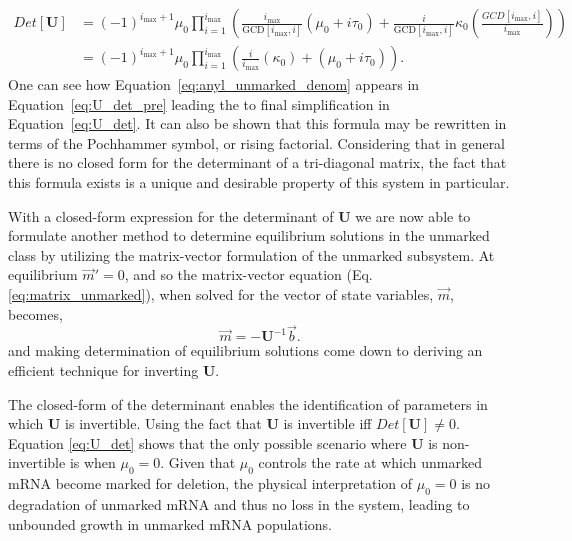\documentclass[review]{elsarticle}
\newcommand{\imax}{\ensuremath{i_{\max}}\xspace}
\newcommand{\GCD}{\ensuremath{\text{GCD}}\xspace}
\let\bs\boldsymbol
\begin{document}
\begin{align}
Det[\bs{U}] &= (-1)^{\imax+1}\mu_0\prod_{i=1}^{\imax}\left(\frac{\imax}{\GCD[\imax,i]}(\mu_0+i\tau_0)+\frac{i}{\GCD[\imax,i]}\kappa_0\left(\frac{GCD[\imax,i]}{\imax}\right)\right)\label{eq:U_det_pre}\\
& =(-1)^{\imax+1}\mu_0\prod_{i=1}^{\imax}{\left(\frac{i}{\imax}(\kappa_0)+(\mu_0+i\tau_0)\right)}.\label{eq:U_det}
\end{align}
One can see how Equation~\ref{eq:anyl_unmarked_denom} appears in Equation~\ref{eq:U_det_pre} leading the to final simplification in Equation~\ref{eq:U_det}.
It can also be shown that this formula may be rewritten in terms of the Pochhammer symbol, or rising factorial.
Considering that in general there is no closed form for the determinant of a tri-diagonal matrix, the fact that this formula exists is a unique and desirable property of this system in particular.

With a closed-form expression for the determinant of $\bs{U}$ we are now able to formulate another method to determine equilibrium solutions in the unmarked class by utilizing the matrix-vector formulation of the unmarked subsystem.
At equilibrium $\vec{m}'=0$, and so the matrix-vector equation (Eq. \ref{eq:matrix_unmarked}), when solved for the vector of state variables, $\vec{m}$, becomes,
\begin{equation}
\vec{m}=-\bs{U}^{-1}\vec{b}.
\end{equation}
and making determination of equilibrium solutions come down to deriving an efficient technique for inverting $\bs{U}$.  

The closed-form of the determinant enables the identification of parameters in which $\bs{U}$ is invertible.
Using the fact that $\bs{U}$ is invertible iff $Det[\bs{U}]\neq0$.
Equation \ref{eq:U_det} shows that the only possible scenario where $\bs{U}$ is non-invertible is when $\mu_0=0$.
Given that $\mu_0$ controls the rate at which unmarked mRNA become marked for deletion, the physical interpretation of $\mu_0=0$ is no degradation of unmarked mRNA and thus no loss in the system, leading to unbounded growth in unmarked mRNA populations.
\end{document}
